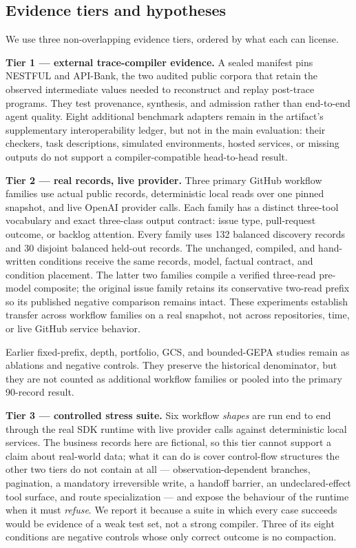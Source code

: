 \subsection{Evidence tiers and hypotheses}

We use three non-overlapping evidence tiers, ordered by what each can license.

\textbf{Tier 1 --- external trace-compiler evidence.} A sealed manifest pins NESTFUL and
API-Bank, the two audited public corpora that retain the observed intermediate values
needed to reconstruct and replay post-trace programs.  They test provenance, synthesis,
and admission rather than end-to-end agent quality.  Eight additional benchmark adapters
remain in the artifact's supplementary interoperability ledger, but not in the main
evaluation: their checkers, task descriptions, simulated environments, hosted services,
or missing outputs do not support a compiler-compatible head-to-head result.

\textbf{Tier 2 --- real records, live provider.} Three primary GitHub workflow families use
actual public records, deterministic local reads over one pinned snapshot, and live OpenAI
provider calls.  Each family has a distinct three-tool vocabulary and exact three-class
output contract: issue type, pull-request outcome, or backlog attention. Every family uses 132 balanced discovery
records and 30 disjoint balanced held-out records.  The unchanged, compiled, and
hand-written conditions receive the same records, model, factual contract, and condition
placement.  The latter two families compile a verified three-read pre-model composite;
the original issue family retains its conservative two-read prefix so its published
negative comparison remains intact.  These experiments establish transfer across workflow
families on a real snapshot, not across repositories, time, or live GitHub service behavior.

Earlier fixed-prefix, depth, portfolio, GCS, and bounded-GEPA studies remain as ablations
and negative controls.  They preserve the historical denominator, but they are not counted
as additional workflow families or pooled into the primary 90-record result.

\textbf{Tier 3 --- controlled stress suite.}  Six workflow \emph{shapes} are run
end to end through the real SDK runtime with live provider calls against deterministic
local services.  The business records here are fictional, so this tier cannot support a
claim about real-world data; what it can do is cover control-flow structures the other two
tiers do not contain at all --- observation-dependent branches, pagination, a mandatory
irreversible write, a handoff barrier, an undeclared-effect tool surface, and route
specialization --- and expose the behaviour of the runtime when it must \emph{refuse}.  We
report it because a suite in which every case succeeds would be evidence of a weak test
set, not a strong compiler.  Three of its eight conditions are negative controls whose
only correct outcome is no compaction.

